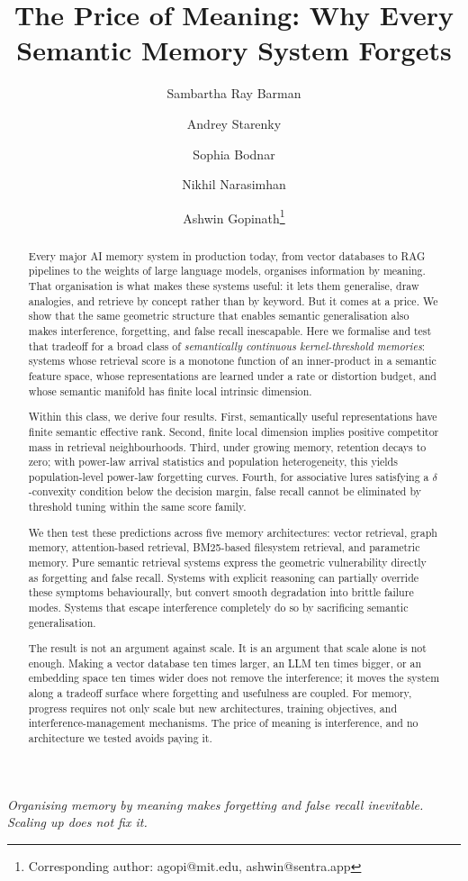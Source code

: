 \documentclass[11pt]{article}
\title{\textbf{The Price of Meaning: Why Every Semantic Memory System Forgets}}
\author[1]{Sambartha Ray Barman}
\author[1]{Andrey Starenky}
\author[1]{Sophia Bodnar}
\author[1]{Nikhil Narasimhan}
\author[1,2]{Ashwin Gopinath\thanks{Corresponding author: agopi@mit.edu, ashwin@sentra.app}}
\affil[1]{Sentra.app, 235 2nd Street, San Francisco, CA 94105, USA}
\affil[2]{Department of Mechanical Engineering, Massachusetts Institute of Technology, 77 Massachusetts Avenue, Cambridge, MA 02139, USA}
\date{}
\newcommand{\subtitle}[1]{\vspace{-0.5em}\begin{center}\large\textit{#1}\end{center}\vspace{0.5em}}
\begin{document}
\maketitle
\subtitle{Organising memory by meaning makes forgetting and false recall inevitable. Scaling up does not fix it.}

\begin{abstract}
\noindent
Every major AI memory system in production today, from vector databases to RAG pipelines to the weights of large language models, organises information by meaning. That organisation is what makes these systems useful: it lets them generalise, draw analogies, and retrieve by concept rather than by keyword. But it comes at a price. We show that the same geometric structure that enables semantic generalisation also makes interference, forgetting, and false recall inescapable. Here we formalise and test that tradeoff for a broad class of \textit{semantically continuous kernel-threshold memories}: systems whose retrieval score is a monotone function of an inner-product in a semantic feature space, whose representations are learned under a rate or distortion budget, and whose semantic manifold has finite local intrinsic dimension.

Within this class, we derive four results. First, semantically useful representations have finite semantic effective rank. Second, finite local dimension implies positive competitor mass in retrieval neighbourhoods. Third, under growing memory, retention decays to zero; with power-law arrival statistics and population heterogeneity, this yields population-level power-law forgetting curves. Fourth, for associative lures satisfying a $\delta$-convexity condition below the decision margin, false recall cannot be eliminated by threshold tuning within the same score family.

We then test these predictions across five memory architectures: vector retrieval, graph memory, attention-based retrieval, BM25-based filesystem retrieval, and parametric memory. Pure semantic retrieval systems express the geometric vulnerability directly as forgetting and false recall. Systems with explicit reasoning can partially override these symptoms behaviourally, but convert smooth degradation into brittle failure modes. Systems that escape interference completely do so by sacrificing semantic generalisation.

The result is not an argument against scale. It is an argument that scale alone is not enough. Making a vector database ten times larger, an LLM ten times bigger, or an embedding space ten times wider does not remove the interference; it moves the system along a tradeoff surface where forgetting and usefulness are coupled. For memory, progress requires not only scale but new architectures, training objectives, and interference-management mechanisms. The price of meaning is interference, and no architecture we tested avoids paying it.
\end{abstract}
\end{document}
